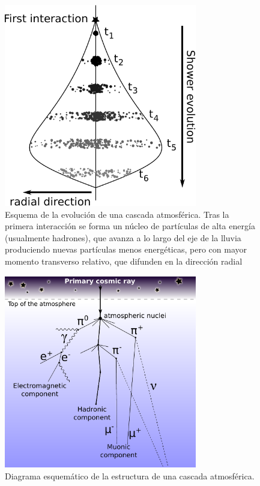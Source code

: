 %
\begin{figure}[ht]
\begin{center}
\includegraphics[width=0.75\textwidth]{fig/EASAuger/lluvia1_english.pdf}
\caption{Esquema de la evolución de una cascada atmosférica. Tras la primera interacción se forma un núcleo de partículas de alta energía (usualmente hadrones), que avanza a lo largo del eje de la lluvia produciendo nuevas partículas menos energéticas, pero con mayor momento transverso relativo, que difunden en la dirección radial}
\label{fig:lluvia1}
\end{center}
\end{figure}
%
%
\begin{figure}[ht]
\begin{center}
\includegraphics[width=0.75\textwidth]{fig/EASAuger/showerSchema_english.pdf}
\caption{Diagrama esquemático de la estructura de una cascada atmosférica.}
\label{fig:showerSchema}
\end{center}
\end{figure}
%


